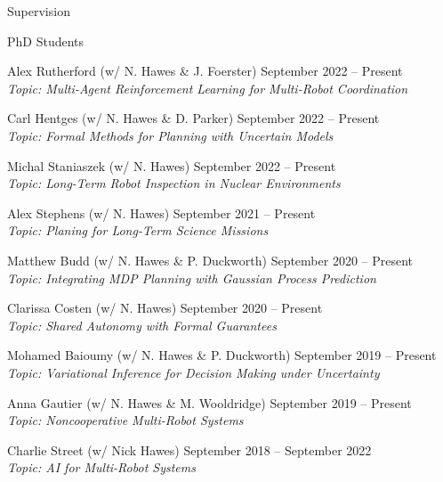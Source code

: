 
\begin{rSection}{Supervision}

\begin{rSubsection}{PhD Students}{}{}{}

\item Alex Rutherford  (w/ N. Hawes \&  J. Foerster) \hfill September 2022 -- Present\\
\textit{Topic: Multi-Agent Reinforcement Learning for Multi-Robot Coordination}

\item Carl Hentges  (w/ N. Hawes \& D. Parker) \hfill September 2022 -- Present\\
\textit{Topic: Formal Methods for Planning with Uncertain Models}

\item Michal Staniaszek  (w/ N. Hawes) \hfill September 2022 -- Present\\
\textit{Topic: Long-Term Robot Inspection in Nuclear Environments}

\item Alex Stephens  (w/ N. Hawes) \hfill September 2021 -- Present\\
\textit{Topic: Planing for Long-Term Science Missions}

\item Matthew Budd  (w/ N. Hawes \& P. Duckworth) \hfill September 2020 -- Present\\
\textit{Topic: Integrating MDP Planning with Gaussian Process Prediction}

\item Clarissa Costen  (w/ N. Hawes) \hfill September 2020 -- Present\\
\textit{Topic: Shared Autonomy with Formal Guarantees}

\item Mohamed Baioumy  (w/ N. Hawes \& P. Duckworth) \hfill September 2019 -- Present\\
\textit{Topic: Variational Inference for Decision Making under Uncertainty}

\item Anna Gautier (w/ N. Hawes \& M. Wooldridge) \hfill September 2019 -- Present\\
\textit{Topic: Noncooperative Multi-Robot Systems}

\item  Charlie Street (w/ Nick Hawes) \hfill September 2018 -- September 2022\\
\textit{Topic: AI for Multi-Robot Systems}


\end{rSubsection}
\end{rSection}
